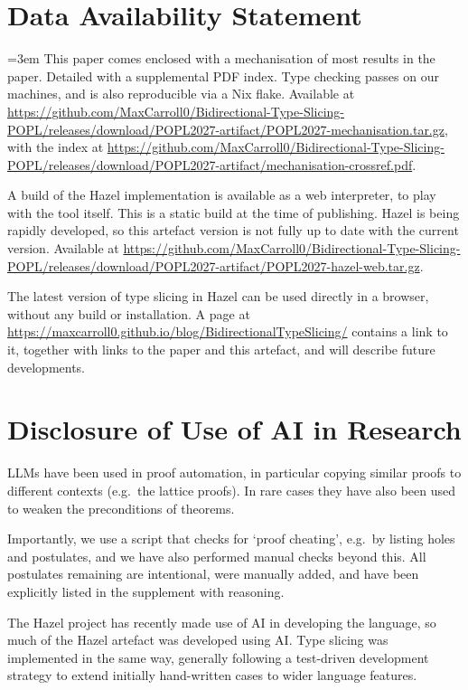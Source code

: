 \section*{Data Availability Statement}
\begingroup\emergencystretch=3em
This paper comes enclosed with a mechanisation of most results in the paper. Detailed with a supplemental PDF index. Type checking passes on our machines, and is also reproducible via a Nix flake. Available at \url{https://github.com/MaxCarroll0/Bidirectional-Type-Slicing-POPL/releases/download/POPL2027-artifact/POPL2027-mechanisation.tar.gz}, with the index at \url{https://github.com/MaxCarroll0/Bidirectional-Type-Slicing-POPL/releases/download/POPL2027-artifact/mechanisation-crossref.pdf}.

A build of the Hazel implementation is available as a web interpreter, to play with the tool itself. This is a static build at the time of publishing. Hazel is being rapidly developed, so this artefact version is not fully up to date with the current version. Available at \url{https://github.com/MaxCarroll0/Bidirectional-Type-Slicing-POPL/releases/download/POPL2027-artifact/POPL2027-hazel-web.tar.gz}.

The latest version of type slicing in Hazel can be used directly in a browser, without any build or installation. A page at \url{https://maxcarroll0.github.io/blog/BidirectionalTypeSlicing/} contains a link to it, together with links to the paper and this artefact, and will describe future developments.

\section*{Disclosure of Use of AI in Research}
LLMs have been used in proof automation, in particular copying similar proofs to different contexts (e.g.\ the lattice proofs). In rare cases they have also been used to weaken the preconditions of theorems.

Importantly, we use a script that checks for `proof cheating', e.g.\ by listing holes and postulates, and we have also performed manual checks beyond this. All postulates remaining are intentional, were manually added, and have been explicitly listed in the supplement with reasoning.

The Hazel project has recently made use of AI in developing the language, so much of the Hazel artefact was developed using AI. Type slicing was implemented in the same way, generally following a test-driven development strategy to extend initially hand-written cases to wider language features.
\par\endgroup
